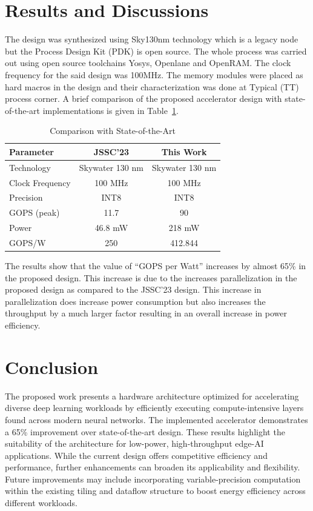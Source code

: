 \documentclass[conference]{IEEEtran}
\begin{document}
\section{Results and Discussions}
\label{sec:results}
The design was synthesized using Sky130nm technology which is a legacy node but the Process Design Kit (PDK) is open source. The whole process was carried out using open source toolchains Yosys, Openlane and OpenRAM. The clock frequency for the said design was 100MHz. The memory modules were placed as hard macros in the design and their characterization was done at Typical (TT) process corner. A brief comparison of the proposed accelerator design with state-of-the-art implementations is given in Table~\ref{tab:comparison}.

\begin{table}[t]
\centering
\caption{Comparison with State-of-the-Art}
\label{tab:comparison}
\begin{tabular}{lcc}
\hline
\textbf{Parameter} & \textbf{JSSC'23 \cite{TinyVers}} & \textbf{This Work} \\
\hline
Technology        & Skywater 130 nm & Skywater 130 nm \\
Clock Frequency   & 100 MHz         & 100 MHz        \\
Precision         & INT8            & INT8           \\
GOPS (peak)       & 11.7            & 90             \\
Power             & 46.8 mW         & 218 mW         \\
GOPS/W            & 250             & 412.844        \\
\hline
\end{tabular}
\end{table}


The results show that the value of “GOPS per Watt” increases by almost 65\% in the proposed design. This increase is due to the increases parallelization in the proposed design as compared to the JSSC’23 design. This increase in parallelization does increase power consumption but also increases the throughput by a much larger factor resulting in an overall increase in power efficiency.
\section{Conclusion}
\label{sec:conclusion}
The proposed work presents a hardware architecture optimized for accelerating diverse deep learning workloads by efficiently executing compute-intensive layers found across modern neural networks. The implemented accelerator demonstrates a 65\% improvement over state-of-the-art design. These results highlight the suitability of the architecture for low-power, high-throughput edge-AI applications. While the current design offers competitive efficiency and performance, further enhancements can broaden its applicability and flexibility. Future improvements may include incorporating variable-precision computation within the existing tiling and dataflow structure to boost energy efficiency across different workloads.


\end{document}
